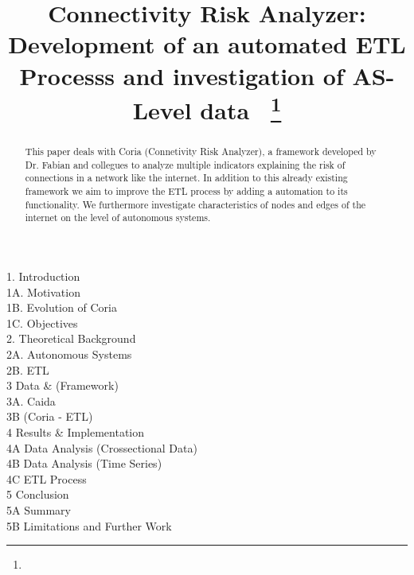 \documentclass[conference]{IEEEtran}
\begin{document}
\title{Connectivity Risk Analyzer: Development of an automated ETL Processs and investigation of AS-Level data\
{\footnotesize \textsuperscript{}}
\thanks{}
}

\author{
\and
{}

}

\maketitle

1. Introduction \\
1A.  Motivation \\
1B.  Evolution of Coria \\
1C.  Objectives \\

2. Theoretical Background \\
2A. Autonomous Systems \\
2B. ETL \\

3 Data \& (Framework) \\
3A. Caida \\
3B  (Coria - ETL) \\

4 Results \& Implementation \\
4A Data Analysis (Crossectional Data) \\
4B Data Analysis (Time Series) \\
4C ETL Process  \\

5 Conclusion \\
5A Summary \\
5B Limitations and Further Work \\

\begin{abstract}

This paper deals with Coria (Connetivity Risk Analyzer), a framework developed by Dr. Fabian and collegues to analyze multiple indicators explaining the risk of connections in a network like the internet. In addition to this already existing framework we aim to improve the ETL process by adding a automation to its functionality. We furthermore investigate characteristics of nodes and edges of the internet on the level of autonomous systems.
\end{abstract}
\end{document}
